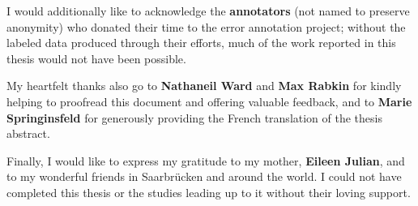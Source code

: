I would additionally like to acknowledge the \textbf{annotators} (not named to preserve anonymity) who donated their time to the error annotation project; without the labeled data produced through their efforts, much of the work reported in this thesis would not have been possible.

My heartfelt thanks also go to \textbf{Nathaneil Ward} and \textbf{Max Rabkin} for kindly helping to proofread this document and offering valuable feedback, and to \textbf{Marie Springinsfeld} for generously providing the French translation of the thesis abstract.

Finally, I would like to express my gratitude to 
my mother, \textbf{Eileen Julian}, and to {my wonderful friends} in Saarbrücken and around the world.
I could not have completed this thesis or the studies leading up to it without 
their loving support.
